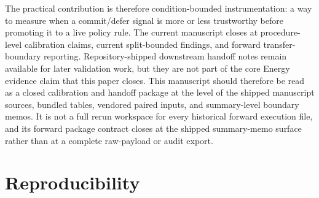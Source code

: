 \documentclass[11pt,a4paper]{article}
\begin{document}
The practical contribution is therefore condition-bounded instrumentation: a way to measure when a commit/defer signal is more or less trustworthy before promoting it to a live policy rule. The current manuscript closes at procedure-level calibration claims, current split-bounded findings, and forward transfer-boundary reporting. Repository-shipped downstream handoff notes remain available for later validation work, but they are not part of the core Energy evidence claim that this paper closes.
This manuscript should therefore be read as a closed calibration and handoff package
at the level of the shipped manuscript sources, bundled tables, vendored paired
inputs, and summary-level boundary memos. It is not a full rerun workspace for every
historical forward execution file, and its forward package contract closes at the
shipped summary-memo surface rather than at a complete raw-payload or audit export.

\section{Reproducibility}
\label{sec:repro}
\end{document}
